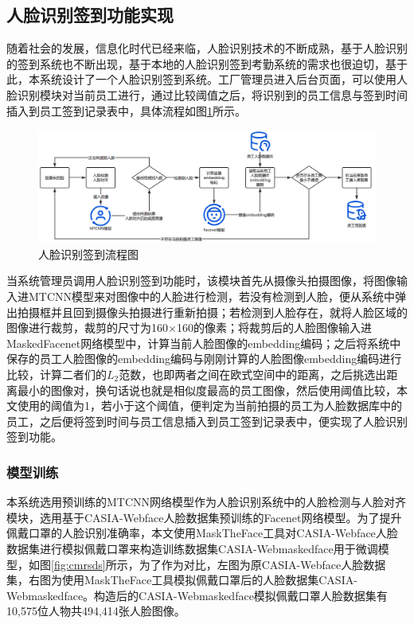 \subsection{人脸识别签到功能实现}

随着社会的发展，信息化时代已经来临，人脸识别技术的不断成熟，基于人脸识别的签到系统也不断出现，基于本地的人脸识别签到考勤系统的需求也很迫切，基于此，本系统设计了一个人脸识别签到系统。工厂管理员进入后台页面，可以使用人脸识别模块对当前员工进行，通过比较阈值之后，将识别到的员工信息与签到时间插入到员工签到记录表中，具体流程如图\ref{fig:fcprcs}所示。

\begin{figure}[H]
    \centering
    \includegraphics[width=\textwidth]{figures/5fcprcs.png}
    \caption{人脸识别签到流程图}
    \label{fig:fcprcs}
\end{figure}

当系统管理员调用人脸识别签到功能时，该模块首先从摄像头拍摄图像，将图像输入进MTCNN模型来对图像中的人脸进行检测，若没有检测到人脸，便从系统中弹出拍摄框并且回到摄像头拍摄进行重新拍摄；若检测到人脸存在，就将人脸区域的图像进行裁剪，裁剪的尺寸为160$\times$160的像素；将裁剪后的人脸图像输入进MaskedFacenet网络模型中，计算当前人脸图像的embedding编码；之后将系统中保存的员工人脸图像的embedding编码与刚刚计算的人脸图像embedding编码进行比较，计算二者们的$L_2$范数，也即两者之间在欧式空间中的距离，之后挑选出距离最小的图像对，换句话说也就是相似度最高的员工图像，然后使用阈值比较，本文使用的阈值为1，若小于这个阈值，便判定为当前拍摄的员工为人脸数据库中的员工，之后便将签到时间与员工信息插入到员工签到记录表中，便实现了人脸识别签到功能。

\subsubsection{模型训练}

本系统选用预训练的MTCNN网络模型作为人脸识别系统中的人脸检测与人脸对齐模块，选用基于CASIA-Webface人脸数据集预训练的Facenet网络模型。为了提升佩戴口罩的人脸识别准确率，本文使用MaskTheFace工具对CASIA-Webface人脸数据集进行模拟佩戴口罩来构造训练数据集CASIA-Webmaskedface用于微调模型，如图\ref{fig:cmrsds}所示，为了作为对比，左图为原CASIA-Webface人脸数据集，右图为使用MaskTheFace工具模拟佩戴口罩后的人脸数据集CASIA-Webmaskedface。构造后的CASIA-Webmaskedface模拟佩戴口罩人脸数据集有10,575位人物共494,414张人脸图像。

